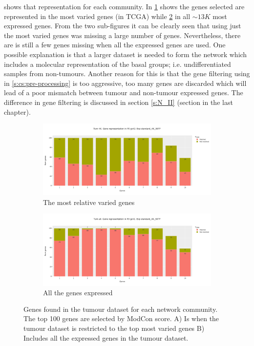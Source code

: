  shows that representation for each community. In \cref{fig:N_I:p0_mev_sel_rep} shows the genes selected are represented in the most varied genes (in TCGA) while \cref{fig:N_I:p0_mev_all_rep} in all $\sim13K$ most expressed genes. From the two sub-figures it can be clearly seen that using just the most varied genes was missing a large number of genes. Nevertheless, there are is still a few genes missing when all the expressed genes are used. One possible explanation is that a larger dataset is needed to form the network which includes a molecular representation of the basal groups; i.e. undifferentiated samples from non-tumours. Another reason for this is that the gene filtering using in \cref{s:cs:pre-processing} is too aggressive, too many genes are discarded which will lead of a poor mismatch between tumour and non-tumour expressed genes. The difference in gene filtering is discussed in section \cref{s:N_II} (section in the last chapter).

\begin{figure}[!htb]
    \centering
    \begin{subfigure}[b]{0.47\textwidth}
        \includegraphics[width=\textwidth,keepaspectratio]{Sections/Network_I/Resources/P0/4K_p0_modConMev_rep_standard_4K_50TF_v3.png}
        \caption{The most relative varied genes}
        \label{fig:N_I:p0_mev_sel_rep}
    \end{subfigure}
    \begin{subfigure}[b]{0.47\textwidth}
        \centering
        \includegraphics[width=\textwidth,keepaspectratio]{Sections/Network_I/Resources/P0/13K_p0_modConMev_rep_standard_4K_50TF_v3.png}
        \caption{All the genes expressed}
        \label{fig:N_I:p0_mev_all_rep}
    \end{subfigure}
    \caption{Genes found in the tumour dataset for each network community. The top 100 genes are selected by ModCon score. A) Is when the tumour dataset is restricted to the top most varied genes B) Includes all the expressed genes in the tumour dataset. }
    \label{fig:N_I:p0_mev_rep}
\end{figure}


